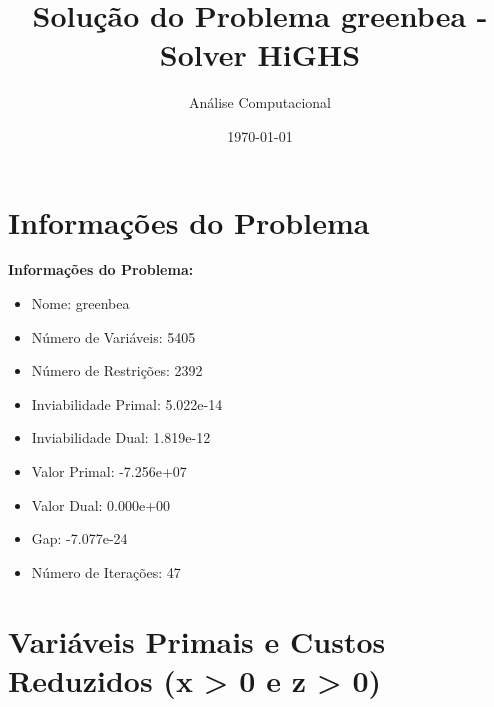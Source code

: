 \documentclass[12pt]{article}
\title{Solução do Problema greenbea - Solver HiGHS}
\author{Análise Computacional}
\date{\today}
\begin{document}
\maketitle

\section{Informações do Problema}

\textbf{Informações do Problema:}
\begin{itemize}
\item Nome: greenbea
\item Número de Variáveis: 5405
\item Número de Restrições: 2392
\item Inviabilidade Primal: 5.022e-14
\item Inviabilidade Dual: 1.819e-12
\item Valor Primal: -7.256e+07
\item Valor Dual: 0.000e+00
\item Gap: -7.077e-24
\item Número de Iterações: 47
\end{itemize}


\section{Variáveis Primais e Custos Reduzidos (x > 0 e z > 0)}
\end{document}
